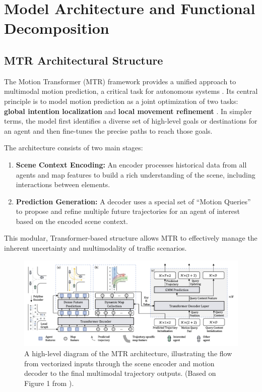 \section{Model Architecture and Functional Decomposition}
\label{ch:model_architecture}

\subsection{MTR Architectural Structure}
\label{sec:model_mtr_architecture}

The Motion Transformer (MTR) framework provides a unified approach to multimodal motion prediction, a critical task for autonomous systems \cite{Shi2022MTR}. Its central principle is to model motion prediction as a joint optimization of two tasks: \textbf{global intention localization} and \textbf{local movement refinement} \cite{Shi2022MTR}. In simpler terms, the model first identifies a diverse set of high-level goals or destinations for an agent and then fine-tunes the precise paths to reach those goals.

The architecture consists of two main stages:
\begin{enumerate}
    \item \textbf{Scene Context Encoding:} An encoder processes historical data from all agents and map features to build a rich understanding of the scene, including interactions between elements.
    \item \textbf{Prediction Generation:} A decoder uses a special set of ``Motion Queries'' to propose and refine multiple future trajectories for an agent of interest based on the encoded scene context.
\end{enumerate}

This modular, Transformer-based structure allows MTR to effectively manage the inherent uncertainty and multimodality of traffic scenarios.

\begin{figure}[htbp]
    \centering
    \includegraphics[width=\textwidth]{figures/mtr_overall_architecture_detail.png}
    \caption{A high-level diagram of the MTR architecture, illustrating the flow from vectorized inputs through the scene encoder and motion decoder to the final multimodal trajectory outputs. (Based on Figure 1 from \cite{Shi2022MTR}).}
    \label{fig:mtr_architecture}
\end{figure}

